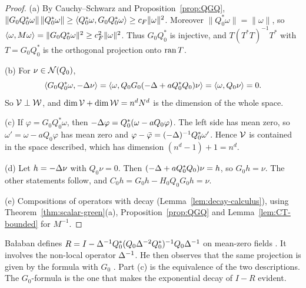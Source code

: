 \begin{proof}
(a) By Cauchy--Schwarz and Proposition~\ref{prop:QGQ}, $\|G_0Q_0^*\omega\|\,\|Q_0^*\omega\|\ge\langle Q_0^*\omega,G_0Q_0^*\omega\rangle\ge c_F\|\omega\|^2$. Moreover $\|Q_0^*\omega\|=\|\omega\|$, so $\langle \omega,M\omega\rangle=\|G_0Q_0^*\omega\|^2\ge c_F^2\|\omega\|^2$. Thus $G_0Q_0^*$ is injective, and $T(T^*T)^{-1}T^*$ with $T=G_0Q_0^*$ is the orthogonal projection onto $\operatorname{ran} T$.

(b) For $\nu\in\mathcal N(Q_0)$,
\[
\langle G_0Q_0^*\omega,-\Delta\nu\rangle=\langle \omega,Q_0G_0(-\Delta+aQ_0^*Q_0)\nu\rangle=\langle \omega,Q_0\nu\rangle=0 .
\]
So $\mathcal V\perp\mathcal W$, and $\dim\mathcal V+\dim\mathcal W=n^dN^d$ is the dimension of the whole space.

(c) If $\varphi=G_0Q_0^*\omega$, then $-\Delta\varphi=Q_0^*(\omega-aQ_0\varphi)$. The left side has mean zero, so $\omega'=\omega-aQ_0\varphi$ has mean zero and $\varphi-\bar\varphi=(-\Delta)^{-1}Q_0^*\omega'$. Hence $\mathcal V$ is contained in the space described, which has dimension $(n^d-1)+1=n^d$.

(d) Let $h=-\Delta\nu$ with $Q_0\nu=0$. Then $(-\Delta+aQ_0^*Q_0)\nu=h$, so $G_0h=\nu$. The other statements follow, and $C_0h=G_0h-H_0Q_0G_0h=\nu$.

(e) Compositions of operators with decay (Lemma~\ref{lem:decay-calculus}), using Theorem~\ref{thm:scalar-green}(a), Proposition~\ref{prop:QGQ} and Lemma~\ref{lem:CT-bounded} for $M^{-1}$.
\end{proof}

\begin{remark}
Ba\l aban defines $R=I-\Delta^{-1}Q_0^*(Q_0\Delta^{-2}Q_0^*)^{-1}Q_0\Delta^{-1}$ on mean-zero fields \cite[(1.38)]{BalPropI}. It involves the non-local operator $\Delta^{-1}$. He then observes that the same projection is given by the formula with $G_0$ \cite[(1.44)]{BalPropI}. Part (c) is the equivalence of the two descriptions. The $G_0$-formula is the one that makes the exponential decay of $I-R$ evident.
\end{remark}
